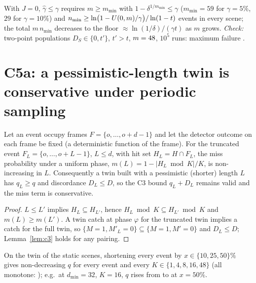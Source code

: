 \begin{remark}
With $J=0$, $\hat\gamma\le\gamma$ requires $m\ge m_{\min}$ with $1-\delta^{1/m_{\min}}\le\gamma$ ($m_{\min}=59$ for
$\gamma=5\%$, $29$ for $\gamma=10\%$) and $n_{\min}\ge\ln\bigl(1-U(0,m)/\gamma\bigr)/\ln(1-t)$ events in every scene;
the total $m\,n_{\min}$ decreases to the floor $\approx\ln(1/\delta)/(\gamma t)$ as $m$ grows. \emph{Check:} two-point
populations $D_S\in\{0,t'\}$, $t'>t$, $m=48$, $10^5$ runs: maximum failure \numCfourbFailMax.
\end{remark}

\section{C5a: a pessimistic-length twin is conservative under periodic sampling}

\begin{proposition}[C5a]\label{prop:c5a}
Let an event occupy frames $F=\{o,\dots,o+d-1\}$ and let the detector outcome on each frame be fixed (a deterministic
function of the frame). For the truncated event $F_L=\{o,\dots,o+L-1\}$, $L\le d$, with hit set $H_L=H\cap F_L$, the
miss probability under a uniform phase, $m(L)=1-|H_L\bmod K|/K$, is non-increasing in $L$. Consequently a twin built
with a pessimistic (shorter) length $L$ has $q_L\ge q$ and discordance $D_L\le D$, so the C3 bound $q_L+D_L$ remains
valid and the miss term is conservative.
\end{proposition}

\begin{proof}
$L\le L'$ implies $H_L\subseteq H_{L'}$, hence $H_L\bmod K\subseteq H_{L'}\bmod K$ and $m(L)\ge m(L')$. A twin catch
at phase $\varphi$ for the truncated twin implies a catch for the full twin, so
$\{M=1,M'_L=0\}\subseteq\{M=1,M'=0\}$ and $D_L\le D$; Lemma~\ref{lem:c3} holds for any pairing.
\end{proof}

\begin{remark}[check]
On the twin of the \numPopM{} static scenes, shortening every event by $x\in\{10,25,50\}\%$ gives non-decreasing $q$ for every
event and every $K\in\{1,4,8,16,48\}$ (all monotone: \numCfiveAll); e.g.\ at $d_{\min}=32$, $K=16$, $q$ rises from
\numCfiveQzero{} to \numCfiveQfifty{} at $x=50\%$.
\end{remark}

